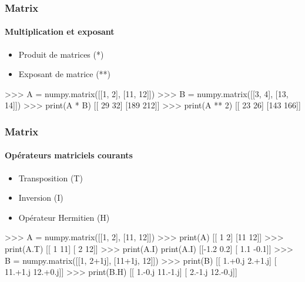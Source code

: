 \begin{frame}[fragile]
\frametitle{Matrix}
\framesubtitle{Multiplication et exposant}
\begin{itemize}
 \item Produit de matrices (*)
 \item Exposant de matrice (**)
\end{itemize}
\begin{pythonConsole}
>>> A = numpy.matrix([[1, 2], [11, 12]])
>>> B = numpy.matrix([[3, 4], [13, 14]])
>>> print(A * B)
[[ 29  32]
 [189 212]]
>>> print(A ** 2)
[[ 23  26]
 [143 166]]
\end{pythonConsole}
\end{frame}
\begin{frame}[fragile]
\frametitle{Matrix}
\framesubtitle{Opérateurs matriciels courants}
\begin{itemize}
 \item Transposition (T)
 \item Inversion (I)
 \item Opérateur Hermitien (H)
\end{itemize}
\begin{pythonConsole}
>>> A = numpy.matrix([[1, 2], [11, 12]])
>>> print(A)
[[ 1  2]
 [11 12]]
>>> print(A.T)
[[ 1 11]
 [ 2 12]]
>>> print(A.I)
print(A.I)
[[-1.2  0.2]
 [ 1.1 -0.1]]
>>> B = numpy.matrix([[1, 2+1j], [11+1j, 12]])
>>> print(B)
[[  1.+0.j   2.+1.j]
 [ 11.+1.j  12.+0.j]]
>>> print(B.H)
[[  1.-0.j  11.-1.j]
 [  2.-1.j  12.-0.j]]
\end{pythonConsole}
\end{frame}
